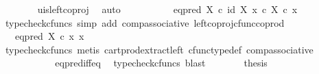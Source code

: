 \begin{isabellebody}
\ \ \ \ \ \ \isamarkupfalse%
\ u{\isacharunderscore}{\kern0pt}is{\isacharunderscore}{\kern0pt}left{\isacharunderscore}{\kern0pt}coproj\ \isamarkupfalse%
\ auto\isanewline
\ \ \ \ \isamarkupfalse%
\ \isamarkupfalse%
\ {\isachardoublequoteopen}{\isachardot}{\kern0pt}{\isachardot}{\kern0pt}{\isachardot}{\kern0pt}\ {\isacharequal}{\kern0pt}\ \ {\isacharparenleft}{\kern0pt}eq{\isacharunderscore}{\kern0pt}pred\ X\ {\isasymcirc}\isactrlsub c\ {\isasymlangle}id\ X{\isacharcomma}{\kern0pt}\ x\ {\isasymcirc}\isactrlsub c\ {\isasymbeta}\isactrlbsub X\isactrlesub {\isasymrangle}{\isacharparenright}{\kern0pt}\ {\isasymcirc}\isactrlsub c\ x\ {\isachardoublequoteclose}\isanewline
\ \ \ \ \ \ \isamarkupfalse%
\ {\isacharparenleft}{\kern0pt}typecheck{\isacharunderscore}{\kern0pt}cfuncs{\isacharcomma}{\kern0pt}\ simp\ add{\isacharcolon}{\kern0pt}\ comp{\isacharunderscore}{\kern0pt}associative{}\ left{\isacharunderscore}{\kern0pt}coproj{\isacharunderscore}{\kern0pt}cfunc{\isacharunderscore}{\kern0pt}coprod{\isacharparenright}{\kern0pt}\isanewline
\ \ \ \ \isamarkupfalse%
\ \isamarkupfalse%
\ {\isachardoublequoteopen}{\isachardot}{\kern0pt}{\isachardot}{\kern0pt}{\isachardot}{\kern0pt}\ {\isacharequal}{\kern0pt}\ eq{\isacharunderscore}{\kern0pt}pred\ X\ {\isasymcirc}\isactrlsub c\ {\isasymlangle}x{\isacharcomma}{\kern0pt}\ x{\isasymrangle}{\isachardoublequoteclose}\isanewline
\ \ \ \ \ \ \isamarkupfalse%
\ {\isacharparenleft}{\kern0pt}typecheck{\isacharunderscore}{\kern0pt}cfuncs{\isacharcomma}{\kern0pt}\ metis\ cart{\isacharunderscore}{\kern0pt}prod{\isacharunderscore}{\kern0pt}extract{\isacharunderscore}{\kern0pt}left\ cfunc{\isacharunderscore}{\kern0pt}type{\isacharunderscore}{\kern0pt}def\ comp{\isacharunderscore}{\kern0pt}associative{\isacharparenright}{\kern0pt}\isanewline
\ \ \ \ \isamarkupfalse%
\ \isamarkupfalse%
\ {\isachardoublequoteopen}{\isachardot}{\kern0pt}{\isachardot}{\kern0pt}{\isachardot}{\kern0pt}\ {\isacharequal}{\kern0pt}\ {\isasymt}{\isachardoublequoteclose}\isanewline
\ \ \ \ \ \ \isamarkupfalse%
\ eq{\isacharunderscore}{\kern0pt}pred{\isacharunderscore}{\kern0pt}iff{\isacharunderscore}{\kern0pt}eq\ \isamarkupfalse%
\ {\isacharparenleft}{\kern0pt}typecheck{\isacharunderscore}{\kern0pt}cfuncs{\isacharcomma}{\kern0pt}\ blast{\isacharparenright}{\kern0pt}\isanewline
\ \ \ \ \isamarkupfalse%
\ \isamarkupfalse%
\ {\isacharquery}{\kern0pt}thesis\isanewline

\end{isabellebody}
